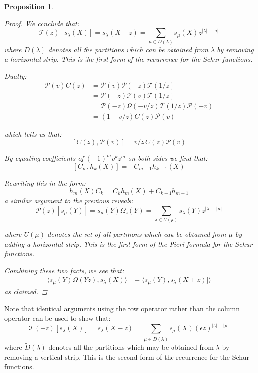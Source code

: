 \documentclass[12pt,dvips]{amsart}
\newtheorem{proposition}{Proposition}[section]
\begin{document}
\begin{proposition}
\begin{proof}
\par\bigskip
We conclude that:
\begin{equation} \label{recurrence}
\mathcal{T}(z) [s_\lambda(X)] = s_\lambda(X + z) = \sum_{\mu \in D(\lambda)} s_\mu(X) z^{|\lambda| - |\mu|}
\end{equation}
where $D(\lambda)$ denotes all the partitions which can be obtained from $\lambda$ by removing a horizontal strip. This is the first form of the recurrence for the Schur functions.

\par\bigskip
Dually:
\begin{align*}
\mathcal{P}(v) C(z) & =  \mathcal{P}(v) \mathcal{P}(-z) \mathcal{T}(1/z) \\
& =  \mathcal{P}(-z) \mathcal{P}(v) \mathcal{T}(1/z) \\
& =  \mathcal{P}(-z) \Omega(-v/z) \mathcal{T}(1/z) \mathcal{P}(-v)  \\
& =  (1-v/z) C(z) \mathcal{P}(v) 
\end{align*}

\noindent
which tells us that:
$$ [C(z), \mathcal{P}(v)]  =  v/z \, C(z) \mathcal{P}(v) $$

\par\bigskip
By equating coefficients of $(-1)^m v^k z^m$ on both sides we find that:
$$ [ C_m, h_k(X) ] = - C_{m+1} h_{k-1}(X) $$

\noindent
Rewriting this in the form:
$$ h_m(X) C_k = C_k h_m(X) + C_{k+1} h_{m-1} $$
a similar argument to the previous reveals:
\begin{equation} \label{pieri}
\mathcal{P}(z)[s_\mu(Y)] = s_\mu(Y) \Omega_z(Y) = \sum_{\lambda \in U(\mu)} s_\lambda(Y)z^{|\lambda| - |\mu|}  
\end{equation}

where $U(\mu)$ denotes the set of all partitions which can be obtained from $\mu$ by {\it adding} a horizontal strip. 
This is the first form of the Pieri formula for the Schur functions.

\par\bigskip
Combining these two facts, we see that:
\begin{align*}
\langle s_\mu(Y) \Omega(Yz), s_\lambda(X) \rangle & =  \langle s_\mu(Y), s_\lambda(X+z)] \rangle
\end{align*}
as claimed.

\end{proof}
\end{proposition}

Note that identical arguments using the row operator rather than the column operator can be used to show that:
\begin{equation}\label{recurrence2}
\mathcal{T}(-z)[s_\lambda(X)] = s_\lambda(X - z) = \sum_{\mu \in \tilde{D}(\lambda)} s_\mu(X) (\epsilon z)^{|\lambda| - |\mu|} 
\end{equation}
where $\tilde{D}(\lambda)$ denotes all the partitions which may be obtained from $\lambda$ by removing a vertical strip.
This is the second form of the recurrence for the Schur functions.
\end{document}
